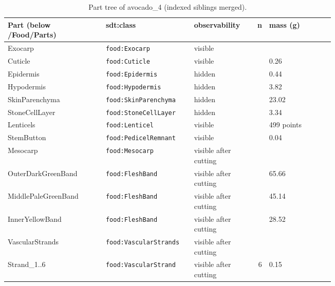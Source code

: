 \documentclass[10.5pt,a4paper]{article}
\begin{document}
\begin{table}[htbp]\centering\scriptsize\caption{Part tree of avocado\_4 (indexed siblings merged).}
\begin{tabularx}{\linewidth}{@{}p{0.30\linewidth}p{0.27\linewidth}p{0.17\linewidth}rX@{}}\toprule Part (below /Food/Parts) & sdt:class & observability & n & mass (g) \\\midrule
\hspace*{0.0em}Exocarp & \texttt{food:Exocarp} & visible &  &  \\
\hspace*{0.9em}Cuticle & \texttt{food:Cuticle} & visible &  & 0.26 \\
\hspace*{0.9em}Epidermis & \texttt{food:Epidermis} & hidden &  & 0.44 \\
\hspace*{0.9em}Hypodermis & \texttt{food:Hypodermis} & hidden &  & 3.82 \\
\hspace*{0.9em}SkinParenchyma & \texttt{food:SkinParenchyma} & hidden &  & 23.02 \\
\hspace*{0.9em}StoneCellLayer & \texttt{food:StoneCellLayer} & hidden &  & 3.34 \\
\hspace*{0.9em}Lenticels & \texttt{food:Lenticel} & visible &  & 499 points \\
\hspace*{0.0em}StemButton & \texttt{food:PedicelRemnant} & visible &  & 0.04 \\
\hspace*{0.0em}Mesocarp & \texttt{food:Mesocarp} & visible after cutting &  &  \\
\hspace*{0.9em}OuterDarkGreenBand & \texttt{food:FleshBand} & visible after cutting &  & 65.66 \\
\hspace*{0.9em}MiddlePaleGreenBand & \texttt{food:FleshBand} & visible after cutting &  & 45.14 \\
\hspace*{0.9em}InnerYellowBand & \texttt{food:FleshBand} & visible after cutting &  & 28.52 \\
\hspace*{0.9em}VascularStrands & \texttt{food:VascularStrands} & visible after cutting &  &  \\
\hspace*{1.8em}Strand\_1..6 & \texttt{food:VascularStrand} & visible after cutting & 6 & 0.15 \\

\end{tabularx}
\end{table}
\end{document}
